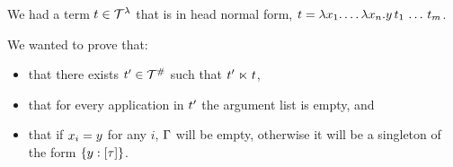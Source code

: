 

We had a term $t \in \mathcal{T}^{\lambda}$ that is in head normal form,
\ie $t = \lambda x_1. \hdots\lambda x_n. y\,t_1\,\hdots\,t_m$.

We wanted to prove that:
  \begin{itemize}
    \item that there exists $t' \in \mathcal{T}^{\mathtt{\#}}$ such that $t' \mathrel{\ltimes} t$,
    \item that for every application in $t'$ the argument list is empty, and
    \item that if $x_i = y$ for any $i$, $\Gamma$ will be empty,
      otherwise it will be a singleton of the form $\{y : [\tau]\}$.
  \end{itemize}

